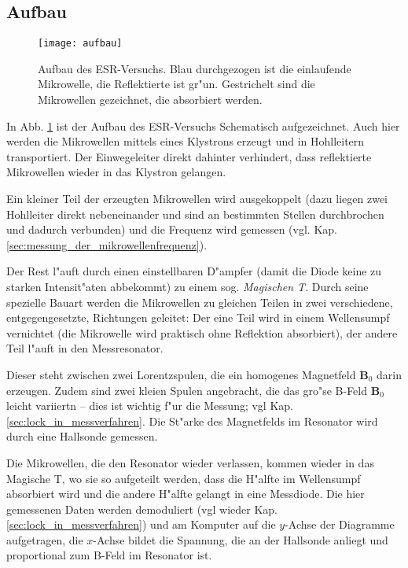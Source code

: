 \documentclass[a4paper,12pt]{article}
\renewcommand{\vec}[1]{\ensuremath{\boldsymbol{#1}}}
\begin{document}
\subsection{Aufbau}
\label{sec:aufbau}



\begin{figure}[!h]
  \centering
  \texttt{[image: aufbau]}
  \caption{Aufbau des ESR-Versuchs. Blau durchgezogen ist die
    einlaufende Mikrowelle, die Reflektierte ist gr"un. Gestrichelt
    sind die Mikrowellen gezeichnet, die absorbiert werden.}
  \label{fig:aufbau_esr}
\end{figure}


In Abb. \ref{fig:aufbau_esr} ist der Aufbau des ESR-Versuchs
Schematisch aufgezeichnet. Auch hier werden die Mikrowellen mittels
eines Klystrons erzeugt und in Hohlleitern transportiert. Der
Einwegeleiter direkt dahinter verhindert, dass reflektierte
Mikrowellen wieder in das Klystron gelangen.

Ein kleiner Teil der erzeugten Mikrowellen wird ausgekoppelt (dazu
liegen zwei Hohlleiter direkt nebeneinander und sind an bestimmten
Stellen durchbrochen und dadurch verbunden) und die Frequenz wird
gemessen (vgl. Kap. \ref{sec:messung_der_mikrowellenfrequenz}).

Der Rest l"auft durch einen einstellbaren D"ampfer (damit die Diode
keine zu starken Intensit"aten abbekommt) zu einem
sog. \emph{Magischen T}. Durch seine spezielle Bauart werden die
Mikrowellen zu gleichen Teilen in zwei verschiedene, entgegengesetzte,
Richtungen geleitet: Der eine Teil wird in einem Wellensumpf
vernichtet (die Mikrowelle wird praktisch ohne Reflektion absorbiert),
der andere Teil l"auft in den Messresonator.

Dieser steht zwischen zwei Lorentzspulen, die ein homogenes Magnetfeld
$\vec B_0$ darin erzeugen. Zudem sind zwei kleien Spulen angebracht,
die das gro"se B-Feld $\vec B_0$ leicht variiertn -- dies ist wichtig
f"ur die Messung; vgl Kap. \ref{sec:lock_in_messverfahren}. Die
St"arke des Magnetfelds im Resonator wird durch eine Hallsonde gemessen.

Die Mikrowellen, die den Resonator wieder verlassen, kommen wieder in
das Magische T, wo sie so aufgeteilt werden, dass die H"alfte im
Wellensumpf absorbiert wird und die andere H"alfte gelangt in eine
Messdiode. Die hier gemessenen Daten werden demoduliert (vgl wieder
Kap. \ref{sec:lock_in_messverfahren}) und am Komputer auf die
$y$-Achse der Diagramme aufgetragen, die $x$-Achse bildet die
Spannung, die an der Hallsonde anliegt und proportional zum B-Feld
im Resonator ist.
\end{document}
